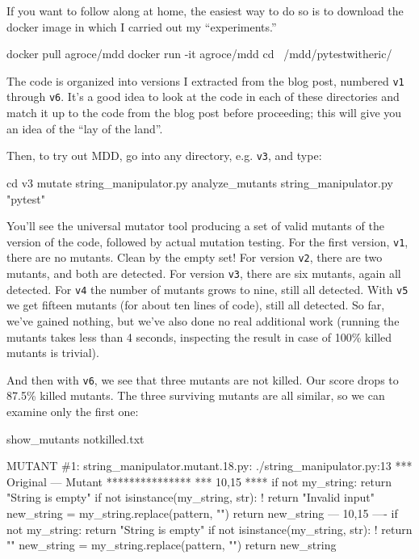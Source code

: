 \documentclass[sigplan,screen]{acmart}
\begin{document}
    If you want to follow along at home, the easiest way to do so is
    to download the docker image in which I carried out my
    ``experiments.''

 \begin{code}
 docker pull agroce/mdd
 docker run -it agroce/mdd
 cd ~/mdd/pytestwitheric/
 \end{code}

The code is organized into versions I extracted from the blog
post, numbered {\tt v1} through {\tt v6}.  It's a good idea to look at
the code in each of these directories and match it up to the code from
the blog post before proceeding; this will give you an idea of the
``lay of the land''.
 
    Then, to try out MDD, go into any directory, e.g. {\tt v3}, and type:

 \begin{code}
 cd v3
 mutate string\_manipulator.py
 analyze\_mutants string\_manipulator.py "pytest"
\end{code}

You'll see the universal mutator tool producing a set of valid mutants
of the version of the code, followed by actual mutation testing.  For
the first version, {\tt v1}, there are no mutants.  Clean by the
empty set!  For version {\tt v2}, there are two mutants, and both are
detected.  For version {\tt v3}, there are six mutants, again all
detected. For {\tt v4} the number of mutants grows to nine, still all
detected.  With {\tt v5} we get fifteen mutants (for about ten lines
of code), still all detected.  So far, we've gained nothing, but we've
also done no real additional work (running the mutants takes less than 4
seconds, inspecting the result in case of 100\% killed mutants is trivial).

And then with {\tt v6}, we see that three mutants are not killed. Our
score drops to 87.5\% killed mutants.  The three surviving mutants are
all similar, so we can examine only the first one:

{\scriptsize
\begin{code}
show\_mutants notkilled.txt 

MUTANT \#1:
string\_manipulator.mutant.18.py: ./string\_manipulator.py:13
*** Original
--- Mutant
***************
*** 10,15 ****
          if not my\_string:  
              return "String is empty"  
          if not isinstance(my\_string, str):  
!             return "Invalid input"  
          new\_string = my\_string.replace(pattern, "")  
          return new\_string
--- 10,15 ----
          if not my\_string:  
              return "String is empty"  
          if not isinstance(my\_string, str):  
!             return ""  
          new\_string = my\_string.replace(pattern, "")  
          return new\_string
        \end{code}
      }
\end{document}
